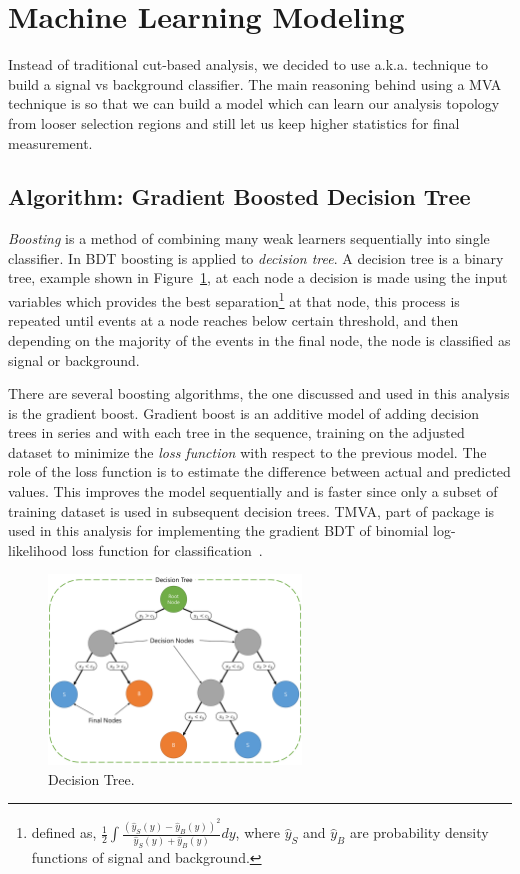 \clearpage
\section{
  Machine Learning Modeling
 }

Instead of traditional cut-based analysis, we decided to use  a.k.a. 
technique to build a signal vs background classifier. The main reasoning behind using
a \gls{MVA} technique is so that we can build a model which can learn our
analysis topology from looser selection regions and still let us keep higher statistics
for final measurement.

\subsection{
  Algorithm: Gradient Boosted Decision Tree
}

\textit{Boosting} is a method of combining many weak learners sequentially into
single classifier. In \gls{BDT} boosting is applied to \textit{decision tree}.
A decision tree is a binary tree,
example shown in Figure~\ref{fig:bdt-dt}, at each node
a decision is made using the input variables which
provides the best separation\footnote{defined as,
  \( \frac{1}{2}
  \int \frac{{(\hat{y}_{S}(y) - \hat{y}_{B}(y))}^2}{\hat{y}_{S}(y) + \hat{y}_{B}(y)} dy \),
  where \(\hat{y}_{S}\) and \(\hat{y}_B\) are probability density functions
  of signal and background.}
at that node, this process is repeated
until events at a node reaches below certain threshold, and then depending
on the majority
of the events in the final node, the node is classified
as signal or background.

There are several boosting algorithms, the one discussed and
used in this analysis is the gradient boost.
Gradient boost is an additive model of adding decision trees
in series and with each tree in the sequence, training on
the adjusted dataset to minimize the \textit{loss function} with
respect to the previous model. The role of the loss function is to estimate
the difference between actual and predicted values. This improves
the model sequentially and is faster since only a subset of
training dataset is used in subsequent decision trees.
\gls{TMVA}, part of \ROOT{} package is used in this analysis
for implementing the gradient \gls{BDT}
of binomial log-likelihood loss function for classification~\cite{tmva-manual}.

\begin{figure}
  \centering
  \includegraphics[width=0.6\textwidth]{figures/bdt_pics.pdf}
  \caption[Decision Tree]{Decision Tree.}%
  \label{fig:bdt-dt}
\end{figure}

